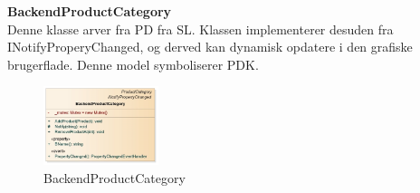  \textbf{BackendProductCategory}\\
Denne klasse arver fra \gls{PD} fra \gls{SL}. Klassen implementerer desuden fra INotifyProperyChanged, og derved kan dynamisk opdatere i den grafiske brugerflade. Denne model symboliserer \gls{PDK}.
\begin{center}
\begin{figure}[!h]
    \centering
    \includegraphics[width=0.30\textwidth]{Systemdesign/backend/klassebeskrivelser/Images/Backendproductcat.png}
    \caption{BackendProductCategory}
    \label{fig:modelhandler}
\end{figure}
\end{center}
\label{Modelhandler_Beskrivelse}
 \bigskip 

